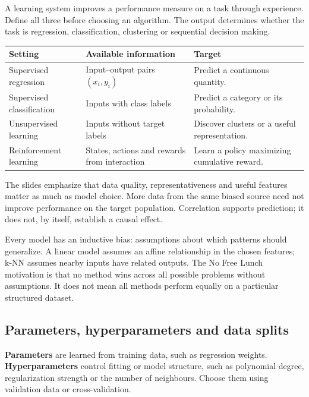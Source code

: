 \documentclass[11pt]{article}
\begin{document}
\tableofcontents\clearpage
{}
A learning system improves a performance measure on a task through experience. Define all three before choosing an algorithm. The output determines whether the task is regression, classification, clustering or sequential decision making.
\begin{longtable}{@{}P{.20\textwidth}P{.32\textwidth}P{.39\textwidth}@{}}
\toprule Setting & Available information & Target\\\midrule\endhead
Supervised regression & Input--output pairs $(x_i,y_i)$ & Predict a continuous quantity.\\
Supervised classification & Inputs with class labels & Predict a category or its probability.\\
Unsupervised learning & Inputs without target labels & Discover clusters or a useful representation.\\
Reinforcement learning & States, actions and rewards from interaction & Learn a policy maximizing cumulative reward.\\\bottomrule
\end{longtable}
The slides emphasize that data quality, representativeness and useful features matter as much as model choice. More data from the same biased source need not improve performance on the target population. Correlation supports prediction; it does not, by itself, establish a causal effect.

Every model has an inductive bias: assumptions about which patterns should generalize. A linear model assumes an affine relationship in the chosen features; k-NN assumes nearby inputs have related outputs. The No Free Lunch motivation is that no method wins across all possible problems without assumptions. It does not mean all methods perform equally on a particular structured dataset.
\subsection{Parameters, hyperparameters and data splits}
\textbf{Parameters} are learned from training data, such as regression weights. \textbf{Hyperparameters} control fitting or model structure, such as polynomial degree, regularization strength or the number of neighbours. Choose them using validation data or cross-validation.
\end{document}
